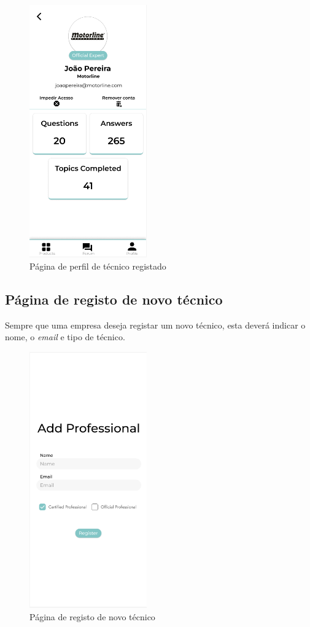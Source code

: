 \begin{figure}[htb]
    \centering
    \includegraphics[width=0.45\textwidth]{images/mockups/professional_profile.png}
    \caption{Página de perfil de técnico registado}
    \label{fig:32}
\end{figure}

\newpage

\subsection{Página de registo de novo técnico}

Sempre que uma empresa deseja registar um novo técnico, esta deverá indicar o nome, o \textit{email} e tipo de técnico.

\begin{figure}[htb]
    \centering
    \includegraphics[width=0.45\textwidth]{images/mockups/account_registering.png}
    \caption{Página de registo de novo técnico}
    \label{fig:33}
\end{figure}